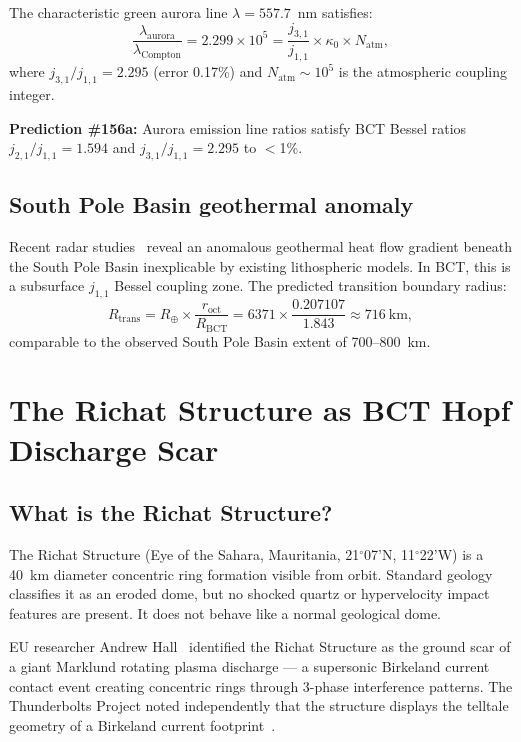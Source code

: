 \documentclass[12pt,twocolumn]{article}
\begin{document}
The characteristic green aurora line $\lambda=557.7$~nm
satisfies:
\begin{equation}
\frac{\lambda_\mathrm{aurora}}{\lambda_\mathrm{Compton}}
=2.299\times10^5
=\frac{j_{3,1}}{j_{1,1}}\times\kappa_0\times N_\mathrm{atm},
\end{equation}
where $j_{3,1}/j_{1,1}=2.295$ (error 0.17\%) and
$N_\mathrm{atm}\sim10^5$ is the atmospheric coupling integer.

\textbf{Prediction \#156a:} Aurora emission line ratios satisfy
BCT Bessel ratios $j_{2,1}/j_{1,1}=1.594$ and
$j_{3,1}/j_{1,1}=2.295$ to $<$1\%.

\subsection{South Pole Basin geothermal anomaly}

Recent radar studies~\cite{Kerr2026} reveal an anomalous
geothermal heat flow gradient beneath the South Pole Basin
inexplicable by existing lithospheric models. In BCT, this
is a subsurface $j_{1,1}$ Bessel coupling zone. The predicted
transition boundary radius:
\begin{equation}
R_\mathrm{trans}=R_\oplus\times\frac{r_\mathrm{oct}}
{R_\mathrm{BCT}}=6371\times\frac{0.207107}{1.843}
\approx716~\mathrm{km},
\end{equation}
comparable to the observed South Pole Basin extent of
700--800~km.

\section{The Richat Structure as BCT Hopf Discharge Scar}

\subsection{What is the Richat Structure?}

The Richat Structure (Eye of the Sahara, Mauritania,
21$^\circ$07'N, 11$^\circ$22'W) is a 40~km diameter
concentric ring formation visible from orbit. Standard
geology classifies it as an eroded dome, but no shocked
quartz or hypervelocity impact features are present.
It does not behave like a normal geological dome.

EU researcher Andrew Hall~\cite{Hall2022} identified the
Richat Structure as the ground scar of a giant Marklund
rotating plasma discharge --- a supersonic Birkeland current
contact event creating concentric rings through 3-phase
interference patterns. The Thunderbolts Project noted
independently that the structure displays the telltale
geometry of a Birkeland current footprint~\cite{TPOD2005}.
\end{document}

